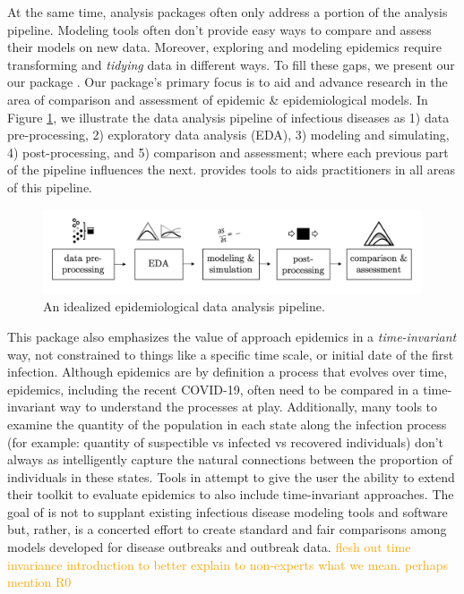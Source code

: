 \documentclass[
  shortnames]{jss}
\begin{document}
At the same time, analysis packages often only address a portion of the
analysis pipeline. Modeling tools often don't provide easy ways to
compare and assess their models on new data. Moreover, exploring and
modeling epidemics require transforming and \textit{tidying} data in
different ways. To fill these gaps, we present our our 
package . Our package's primary focus is to aid and
advance research in the area of comparison and assessment of epidemic \&
epidemiological models. In Figure \ref{fig:pipeline}, we illustrate the
data analysis pipeline of infectious diseases as 1) data pre-processing,
2) exploratory data analysis (EDA), 3) modeling and simulating, 4)
post-processing, and 5) comparison and assessment; where each previous
part of the pipeline influences the next.  provides
tools to aids practitioners in all areas of this pipeline.

\begin{figure}[!ht]
    \centering
    \includegraphics[width = 1\textwidth]{images/pipeline1.png}
    \caption{An idealized epidemiological data analysis pipeline.}
    \label{fig:pipeline}
\end{figure}

This package also emphasizes the value of approach epidemics in a
\textit{time-invariant} way, not constrained to things like a specific
time scale, or initial date of the first infection. Although epidemics
are by definition a process that evolves over time, epidemics, including
the recent COVID-19, often need to be compared in a time-invariant way
to understand the processes at play. Additionally, many tools to examine
the quantity of the population in each state along the infection process
(for example: quantity of suspectible vs infected vs recovered
individuals) don't always as intelligently capture the natural
connections between the proportion of individuals in these states. Tools
in  attempt to give the user the ability to extend their
toolkit to evaluate epidemics to also include time-invariant approaches.
The goal of  is not to supplant existing infectious
disease modeling tools and software but, rather, is a concerted effort
to create standard and fair comparisons among models developed for
disease outbreaks and outbreak data.
\textcolor{orange}{flesh out time invariance introduction to better explain to non-experts what we mean.  perhaps mention R0}
\end{document}
